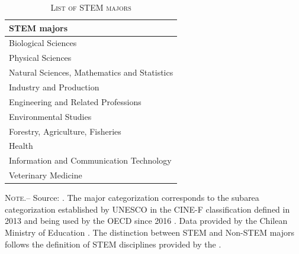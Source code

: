 \begin{table}[htbp]\centering
\small
\centering
	\caption{\textsc{List of STEM majors}}
 \label{tab: listSTEMmajors}
 \begin{threeparttable}
    \begin{tabular*}{\textwidth}{@{\extracolsep{\fill}}l@{}} 
 \toprule
        STEM majors\\ 
\midrule
        
        Biological Sciences \\ 
        Physical Sciences \\
        Natural Sciences, Mathematics and Statistics \\ 
        Industry and Production \\ 
        Engineering and Related Professions \\         Environmental Studies \\ 
                Forestry, Agriculture, Fisheries \\
        Health \\ 
        Information and Communication Technology \\ 
        Veterinary Medicine \\ 
\bottomrule
    \end{tabular*}
\begin{tablenotes}\singlespacing
 \item   \scriptsize \noindent \textsc{ Note.--}  Source: \cite{tincani_miglino_university_major_classifications_2026}. The major categorization corresponds to the subarea categorization established by UNESCO in the CINE-F classification defined in 2013 and being used by the OECD since 2016 \citep{listmajors}. Data provided by the Chilean Ministry of Education \citep{mineduc2023sistema}. The distinction between STEM and Non-STEM majors follows the definition of STEM disciplines provided by the \citet{STEMclassification}. 
 \end{tablenotes}
  \end{threeparttable}
\end{table}